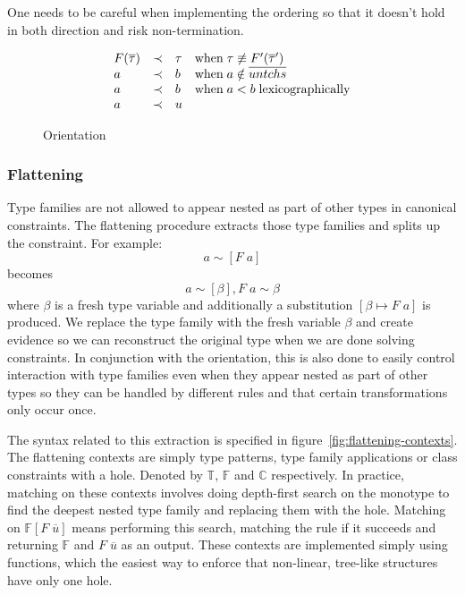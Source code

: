 One needs to be careful when implementing the ordering so that it doesn't hold
in both direction and risk non-termination.

\begin{figure}
\[
\begin{array}{l c l l}
F(\overline{\tau}) &\prec& \tau &\text{when} \; \tau \not\equiv
F'(\overline{\tau}')
\\
a &\prec& b &\text{when} \; a \notin \overline{untchs}
\\
a &\prec& b &\text{when} \; a < b \; \text{lexicographically}
\\
a &\prec& u
\end{array}
\]
\caption{Orientation}
\label{fig:orientation}
\end{figure}

\subsubsection{Flattening}
Type families are not allowed to appear nested as part of other types in
canonical constraints. The flattening procedure extracts those type families and
splits up the constraint. For example:
$$
a \sim [F \; a]
$$
becomes
$$
a \sim [\beta], F \; a \sim \beta
$$
where $\beta$ is a fresh type variable and additionally a substitution $[\beta
\mapsto F \; a]$ is produced. We replace the type family with the fresh variable
$\beta$ and create evidence so we can reconstruct the original type when we are
done solving constraints. In conjunction with the orientation, this is also done
to easily control interaction with type families even when they appear nested as
part of other types so they can be handled by different rules and that certain
transformations only occur once.


The syntax related to this extraction is specified in
figure~\ref{fig:flattening-contexts}. The flattening contexts are simply type
patterns, type family applications or class constraints with a hole. Denoted by
$\mathbb{T}$, $\mathbb{F}$ and $\mathbb{C}$ respectively. In practice, matching
on these contexts involves doing depth-first search on the monotype to find the
deepest nested type family and replacing them with the hole. Matching on
$\mathbb{F}[F \; \overline{u}]$ means performing this search, matching the rule
if it succeeds and returning $\mathbb{F}$ and $F \; \overline{u}$ as an output.
These contexts are implemented simply using functions, which the easiest way to
enforce that non-linear, tree-like structures have only one hole.

